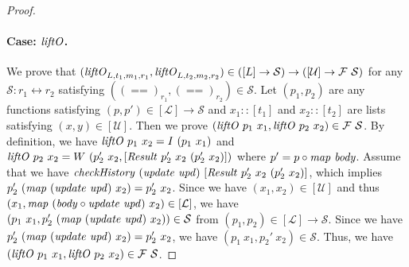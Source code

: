 \documentclass{article}
\theoremstyle{definition}
\newcommand{\BETWEEN}{\leftrightarrow}
\newcommand{\texteq}{\mathrel{\texttt{==}}}
\begin{document}
\begin{proof}
\paragraph{Case: $\mathit{liftO}$.}
We prove that $(\mathit{liftO}_{L,t_1,m_1,r_1}, \mathit{liftO}_{L,t_2,m_2,r_2}) \in 
([L] \to \mathcal{S}) \to ([\mathcal{U}] \to \mathcal{F}~\mathcal{S})$ for any $\mathcal{S} : r_1 \BETWEEN r_2$ satisfying $((\texteq)_{r_1}, (\texteq)_{r_2}) \in \mathcal{S}$.
Let $(p_1,p_2)$ are any functions satisfying $(p,p') \in [\mathcal{L}] \to \mathcal{S}$ and $x_1 :: [t_1]$ and $x_2 :: [t_2]$ are lists satisfying $(x,y) \in [\mathcal{U}]$. Then we prove $(\mathit{liftO}~p_1~x_1, \mathit{liftO}~p_2~x_2) \in \mathcal{F}~\mathcal{S}$. By definition, we have $\mathit{liftO}~p_1~x_2 = I~(p_1~x_1)$
 and $\mathit{liftO}~p_2~x_2 = W~(p_2'~x_2, [\mathit{Result}~p_2'~x_2~(p_2'~x_2)])$ where 
$p' = p \circ \mathit{map}~\mathit{body}$. 
Assume that we have $\mathit{checkHistory}~(\mathit{update}~\mathit{upd})~[\mathit{Result}~p_2'~x_2~(p_2'~x_2)]$, which implies $p_2'~(\mathit{map}~(\mathit{update}~\mathit{upd})~x_2) = p_2'~x_2$.
Since we have $(x_1,x_2) \in [\mathcal{U}]$ 
and thus $(x_1, \mathit{map}~(\mathit{body} \circ \mathit{update}~\mathit{upd})~x_2) \in [\mathcal{L}]$, we have $(p_1~x_1,p'_2~(\mathit{map}~(\mathit{update}~\mathit{upd})~x_2)) \in \mathcal{S}$ from $(p_1,p_2) \in [\mathcal{L}] \to \mathcal{S}$.
Since we have $p_2'~(\mathit{map}~(\mathit{update}~\mathit{upd})~x_2) = p_2'~x_2$, 
we have $(p_1~x_1,p_2'~x_2) \in \mathcal{S}$.
Thus, we have $(\mathit{liftO}~p_1~x_1, \mathit{liftO}~p_2~x_2) \in \mathcal{F}~\mathcal{S}$.


\end{proof}
\end{document}
